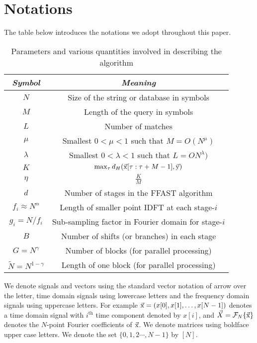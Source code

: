 \section{Notations}

The table below introduces the notations we adopt throughout this paper.
\begin{table}[h!]
\begin{center}
	\begin{tabular}{cc} 	
		\hline		
		\textit{Symbol}	    &  \textit{Meaning} \\		
		\hline
		$N$           				& Size of the string or database in symbols \\
	
		$M$   				        & Length of the query in symbols \\

        $L$    						&   Number of matches \\
		$\mu$ 				        & Smallest $0<\mu<1$ such that $M =O(N^{\mu})$\\		
		$\lambda$       		& Smallest $0<\lambda<1$ such that $L =ON^\lambda)$\\
        $K$                        &$\max_{\tau}d_{H}(\vec{\mathrm{x}}[\tau:\tau+M-1],\vec{\mathrm{y}})$\\
	    $\eta$             &$\frac{K}{M}$\\
$d$           				& Number of stages in the FFAST algorithm \\
$f_i \approx N^\alpha$     & Length of smaller point IDFT at each stage-$i$\\
$g_i = N/f_i$     	    &  Sub-sampling factor in Fourier domain for stage-$i$\\
$B$   					    & Number of shifts (or branches) in each stage \\
$G = N^\gamma$    & Number of blocks (for parallel processing)\\
$\tilde{N} = N^{1-\gamma}$   & Length of one block (for parallel processing)\\
		\hline
	\end{tabular}
\end{center}	
\caption{Parameters and various quantities involved in describing the algorithm}
\label{Table:Notations}
\end{table}	
We denote signals and vectors using the standard vector notation of arrow over the letter, time domain signals using lowercase letters and the frequency domain signals using uppercase letters. For example $\vec{\mathrm{x}} = (x[0], x[1], \ldots, x[N-1] )$ denotes a time domain signal with $i^{\text{th}}$ time component denoted by $x[i]$, and $\vec{X}= \mathcal{F}_{N}\{\vec{\mathrm{x}}\}$ denotes the $N$-point Fourier coefficients of $\vec{\mathrm{x}}$. We denote matrices using boldface upper case letters. We denote the set $\{0,1,2\cdots, N-1\}$ by $[N]$.%